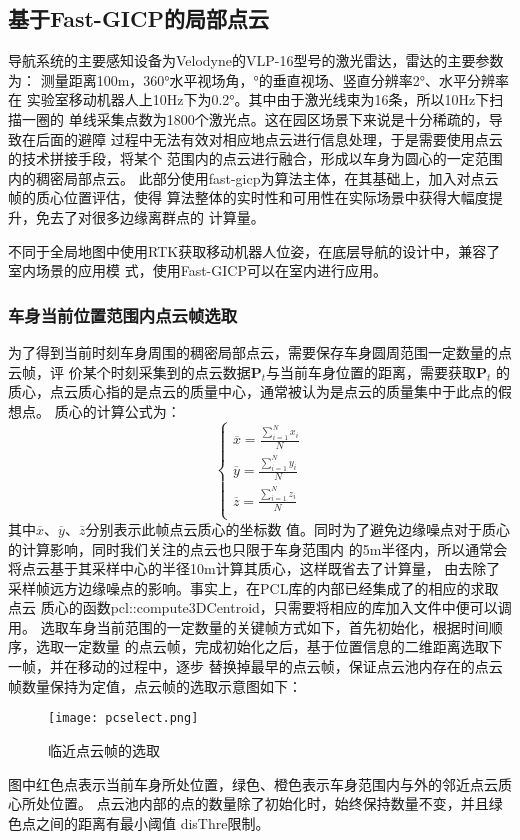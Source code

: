 \subsection{基于Fast-GICP的局部点云}
导航系统的主要感知设备为Velodyne的VLP-16型号的激光雷达，雷达的主要参数为：
测量距离100m，360°水平视场角，°的垂直视场、竖直分辨率2°、水平分辨率在
实验室移动机器人上10Hz下为0.2°。其中由于激光线束为16条，所以10Hz下扫描一圈的
单线采集点数为1800个激光点。这在园区场景下来说是十分稀疏的，导致在后面的避障
过程中无法有效对相应地点云进行信息处理，于是需要使用点云的技术拼接手段，将某个
范围内的点云进行融合，形成以车身为圆心的一定范围内的稠密局部点云。
此部分使用fast-gicp为算法主体，在其基础上，加入对点云帧的质心位置评估，使得
算法整体的实时性和可用性在实际场景中获得大幅度提升，免去了对很多边缘离群点的
计算量。


不同于全局地图中使用RTK获取移动机器人位姿，在底层导航的设计中，兼容了室内场景的应用模
式，使用Fast-GICP可以在室内进行应用。



\subsubsection{车身当前位置范围内点云帧选取}
为了得到当前时刻车身周围的稠密局部点云，需要保存车身圆周范围一定数量的点云帧，评
价某个时刻采集到的点云数据$\symbf{P}_t$与当前车身位置的距离，需要获取$\symbf{P}_t$
的质心，点云质心指的是点云的质量中心，通常被认为是点云的质量集中于此点的假想点。
质心的计算公式为：
\begin{equation}
    \begin{cases}
       \overline{x} = \frac{\sum\limits_{i=1}^{N}x_i}{N}\\
       \overline{y} = \frac{\sum\limits_{i=1}^{N}y_i}{N}\\
       \overline{z} = \frac{\sum\limits_{i=1}^{N}z_i}{N}\\
    \end{cases}
\end{equation}
其中$\overline{x}$、$\overline{y}$、$\overline{z}$分别表示此帧点云质心的坐标数
值。同时为了避免边缘噪点对于质心的计算影响，同时我们关注的点云也只限于车身范围内
的5m半径内，所以通常会将点云基于其采样中心的半径10m计算其质心，这样既省去了计算量，
由去除了采样帧远方边缘噪点的影响。事实上，在PCL库的内部已经集成了的相应的求取点云
质心的函数pcl::compute3DCentroid，只需要将相应的库加入文件中便可以调用。
选取车身当前范围的一定数量的关键帧方式如下，首先初始化，根据时间顺序，选取一定数量
的点云帧，完成初始化之后，基于位置信息的二维距离选取下一帧，并在移动的过程中，逐步
替换掉最早的点云帧，保证点云池内存在的点云帧数量保持为定值，点云帧的选取示意图如下：
\begin{figure}[ht]
    \centering
    \texttt{[image: pcselect.png]}
    \caption{临近点云帧的选取}
\end{figure}
图中红色点表示当前车身所处位置，绿色、橙色表示车身范围内与外的邻近点云质心所处位置。
点云池内部的点的数量除了初始化时，始终保持数量不变，并且绿色点之间的距离有最小阈值
disThre限制。

